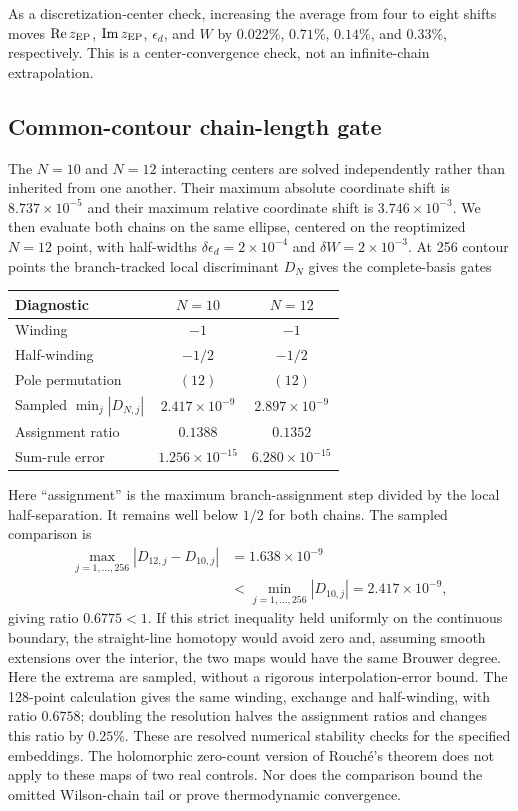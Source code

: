 \documentclass[%
  aps,physrev,onecolumn,10pt,amsmath,amssymb,superscriptaddress,longbibliography,floatfix
]{revtex4-2}
\begin{document}
As a discretization-center check, increasing the average from four to eight
shifts moves \(\operatorname{Re}z_{\rm EP}\),
\(\operatorname{Im}z_{\rm EP}\), \(\epsilon_d\), and \(W\) by
\(0.022\%\), \(0.71\%\), \(0.14\%\), and \(0.33\%\), respectively.
This is a center-convergence check, not an infinite-chain extrapolation.

\subsection{Common-contour chain-length gate}

The $N=10$ and $N=12$ interacting centers are solved independently rather
than inherited from one another.  Their maximum absolute coordinate shift is
$8.737\times10^{-5}$ and their maximum relative coordinate shift is
$3.746\times10^{-3}$.  We then evaluate both chains on the same ellipse,
centered on the reoptimized $N=12$ point, with half-widths $\delta\epsilon_d=2\times10^{-4}$ and $\delta W=2\times10^{-3}$.
At 256 contour points the branch-tracked local discriminant $D_N$ gives the
complete-basis gates
\begin{center}
\begin{tabular}{@{}lcc@{}}
\toprule
Diagnostic & $N=10$ & $N=12$\\
\midrule
Winding & $-1$ & $-1$\\
Half-winding & $-1/2$ & $-1/2$\\
Pole permutation & $(12)$ & $(12)$\\
Sampled $\min_j|D_{N,j}|$ & $2.417\times10^{-9}$ & $2.897\times10^{-9}$\\
Assignment ratio & $0.1388$ & $0.1352$\\
Sum-rule error & $1.256\times10^{-15}$ & $6.280\times10^{-15}$\\
\bottomrule
\end{tabular}
\end{center}
Here ``assignment'' is the maximum branch-assignment step divided by the
local half-separation.  It remains well below $1/2$ for both chains.  The
sampled comparison is
\begin{equation}
\begin{aligned}
\max_{j=1,\ldots,256}|D_{12,j}-D_{10,j}|&=1.638\times10^{-9}\\
&<\min_{j=1,\ldots,256}|D_{10,j}|=2.417\times10^{-9},
\end{aligned}
\label{eq:app_finiteU_rouche}
\end{equation}
giving ratio $0.6775<1$.  If this strict inequality held uniformly on the
continuous boundary, the straight-line homotopy would avoid zero and,
assuming smooth extensions over the interior, the two maps would have the
same Brouwer degree.  Here the extrema are sampled, without a rigorous
interpolation-error bound.  The 128-point calculation gives the same winding,
exchange and half-winding, with ratio $0.6758$; doubling the resolution halves
the assignment ratios and changes this ratio by $0.25\%$.  These are
resolved numerical stability checks for the specified embeddings.
The holomorphic zero-count version of Rouch\'e's theorem does not apply to
these maps of two real controls.  Nor does the comparison bound the omitted
Wilson-chain tail or prove thermodynamic convergence.
\end{document}
